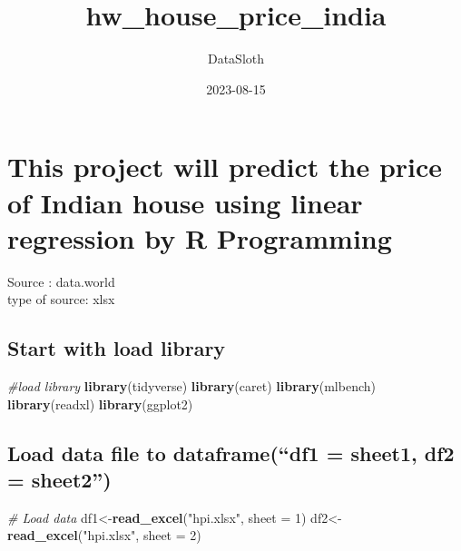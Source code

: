 \documentclass[
]{article}
\title{hw\_house\_price\_india}
\author{DataSloth}
\date{2023-08-15}
\newenvironment{Shaded}{\begin{snugshade}}{\end{snugshade}}
\newcommand{\AttributeTok}[1]{\textcolor[rgb]{0.13,0.29,0.53}{#1}}
\newcommand{\CommentTok}[1]{\textcolor[rgb]{0.56,0.35,0.01}{\textit{#1}}}
\newcommand{\DecValTok}[1]{\textcolor[rgb]{0.00,0.00,0.81}{#1}}
\newcommand{\FunctionTok}[1]{\textcolor[rgb]{0.13,0.29,0.53}{\textbf{#1}}}
\newcommand{\NormalTok}[1]{#1}
\newcommand{\OtherTok}[1]{\textcolor[rgb]{0.56,0.35,0.01}{#1}}
\newcommand{\StringTok}[1]{\textcolor[rgb]{0.31,0.60,0.02}{#1}}
\begin{document}
\maketitle

\hypertarget{this-project-will-predict-the-price-of-indian-house-using-linear-regression-by-r-programming}{%
\section{This project will predict the price of Indian house using
linear regression by R
Programming}\label{this-project-will-predict-the-price-of-indian-house-using-linear-regression-by-r-programming}}

Source : data.world\\
type of source: xlsx

\hypertarget{start-with-load-library}{%
\subsection{Start with load library}\label{start-with-load-library}}

\begin{Shaded}
\begin{Highlighting}[]
\CommentTok{\#load library}
\FunctionTok{library}\NormalTok{(tidyverse)}
\FunctionTok{library}\NormalTok{(caret)}
\FunctionTok{library}\NormalTok{(mlbench)}
\FunctionTok{library}\NormalTok{(readxl)}
\FunctionTok{library}\NormalTok{(ggplot2)}
\end{Highlighting}
\end{Shaded}

\hypertarget{load-data-file-to-dataframedf1-sheet1-df2-sheet2}{%
\subsection{Load data file to dataframe(``df1 = sheet1, df2 =
sheet2'')}\label{load-data-file-to-dataframedf1-sheet1-df2-sheet2}}

\begin{Shaded}
\begin{Highlighting}[]
\CommentTok{\# Load data}
\NormalTok{df1}\OtherTok{\textless{}{-}}\FunctionTok{read\_excel}\NormalTok{(}\StringTok{"hpi.xlsx"}\NormalTok{, }\AttributeTok{sheet =} \DecValTok{1}\NormalTok{)}
\NormalTok{df2}\OtherTok{\textless{}{-}}\FunctionTok{read\_excel}\NormalTok{(}\StringTok{"hpi.xlsx"}\NormalTok{, }\AttributeTok{sheet =} \DecValTok{2}\NormalTok{)}
\end{Highlighting}
\end{Shaded}
\end{document}
